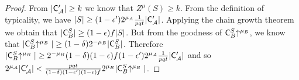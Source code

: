\begin{proof}
    From $|\mathsf{C}'_\mathcal{A}| \geq k$ we know that $Z^\mu(S) \geq k$. From the
    definition of typicality, we have $|S| \geq (1 -
    \epsilon')2^{\mu_A}\frac{1}{pqt}|\mathsf{C}'_\mathcal{A}|$.
    Applying the chain growth theorem \cite{backbone} we obtain that $|\mathsf{C}_B^S|
    \geq (1 - \epsilon)f|S|$. But from the goodness of $\mathsf{C}_B^S\negthickspace\uparrow^{\mu_B}$, we
    know that $|\mathsf{C}_B^S\negthickspace\uparrow^{\mu_B}| \geq (1 -
    \delta)2^{-\mu_B}|\mathsf{C}_B^S|$. Therefore $|\mathsf{C}_B^S\negthickspace\uparrow^{\mu_B}| \geq
    2^{-\mu_B}(1 - \delta)(1 - \epsilon)f(1 -
    \epsilon')2^{\mu_\mathcal{A}}\frac{1}{pqt}|\mathsf{C}'_\mathcal{A}|$ and so
    $2^{\mu_\mathcal{A}}|\mathsf{C}'_\mathcal{A}|
    <
    \frac{pqt}{(1 - \delta)(1 -
    \epsilon')(1 - \epsilon)f}2^{\mu_B}|\mathsf{C}_B^S\negthickspace\uparrow^{\mu_B}|$.
\end{proof}

